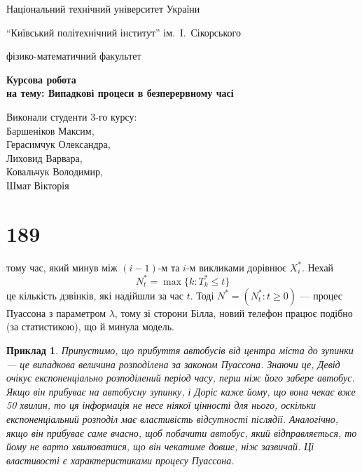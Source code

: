 \documentclass[12pt,fleqn]{article}
\newtheorem{example}{Приклад}[section]
\numberwithin{figure}{section}
\numberwithin{equation}{section}
\begin{document}
\large

\setcounter{page}{0}
\thispagestyle{empty}
\centerline{Національний технічний університет України}
\centerline{``Київський політехнічний інститут'' ім.~І.~Сікорського}
\centerline{фізико-математичний факультет}

\vspace{50mm}

\begin{center}
\Large\bf
Курсова робота\\[5mm]
на тему: Випадкові процеси в безперервному часі

\end{center}

\vspace{50mm}

\begin{flushright}
\begin{minipage}{70mm}
\large Виконали студенти 3-го курсу:\\
Баршеніков Максим, \\
Герасимчук Олександра, \\
Лиховид Варвара, \\
Ковальчук Володимир, \\
Шмат Вікторія 
\end{minipage}
\end{flushright}
\newpage

\tableofcontents


\newpage


\section{189}\label{189}\allowdisplaybreaks

тому час, який минув між $(i-1)$-м та $i$-м викликами дорівнює $X_{i}^{*}$. Нехай
$$N_{t}^{*}=\max\{k: T_{k}^{*}\leq t\}$$
це кількість дзвінків, які надійшли за час $t$. Тоді $N^{*}=(N_{t}^{*}:t\geq 0)$ --- процес Пуассона з параметром $\lambda$, тому зі сторони Білла, новий телефон працює подібно (за статистикою), що й минула модель.

\begin{example}
    Припустимо, що прибуття автобусів від центра міста до зупинки --- це випадкова величина розподілена за законом Пуассона. Знаючи це, Девід  очікує експоненціально розподілений період часу, перш ніж його забере автобус.  Якщо він прибуває на автобусну зупинку, і Доріс  каже йому, що вона чекає вже 50 хвилин, то ця інформація не несе ніякої цінності для нього, оскільки експоненціальний розподіл має властивість відсутності післядії. Аналогічно, якщо він прибуває саме вчасно, щоб побачити автобус, який відправляється, то йому не варто хвилюватися, що він чекатиме довше, ніж зазвичай. Ці властивості є характеристиками процесу Пуассона.
\end{example}
\end{document}
